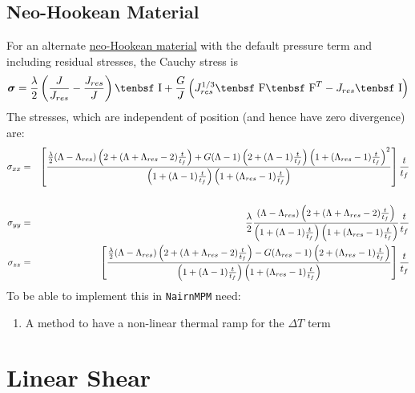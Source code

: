 \documentclass[11pt]{book}
\newcommand{\tens}[1]{\boldsymbol{\mathsf{#1}}}
\def\F{\hbox{\tenbsf F}}
\def\I{\hbox{\tenbsf I}}
\def\Jres{J_{res}}
\begin{document}
\subsection{Neo-Hookean Material}

For an alternate \hyperref[NHM]{neo-Hookean material} with the default pressure term and including residual stresses, the Cauchy stress is
\begin{equation}
     \tens\sigma = {\lambda\over 2}\left({J\over\Jres}- {\Jres\over J}\right)\I + { G\over J}\left( \Jres^{1/3}\F\F^T - \Jres\I\right) 
\end{equation}
The stresses, which are independent of position (and hence have zero divergence) are:
\begin{eqnarray}
    \sigma_{xx} & = & \left[ {{\lambda\over 2}(\Lambda-\Lambda_{res})\left(2 + (\Lambda+\Lambda_{res}-2){t\over t_f}\right) 
                                      +  G  (\Lambda-1) \left(2 + (\Lambda-1){t\over t_f}\right)\left(1 + (\Lambda_{res}-1){t\over t_f}\right)^2\over
                                     \left(1 + (\Lambda-1){t\over t_f}\right) \left(1 + (\Lambda_{res}-1){t\over t_f}\right)}
                                      \right]  {t\over t_f }  \nonumber\\ &&\\
    \sigma_{yy} & = &  {\lambda\over 2} {(\Lambda-\Lambda_{res})\left(2 + (\Lambda+\Lambda_{res}-2){t\over t_f}\right) \over
                                    \left(1 + (\Lambda-1){t\over t_f}\right) \left(1 + (\Lambda_{res}-1){t\over t_f}\right)}{t\over t_f } \\
    \sigma_{zz} & = & \left[  {{\lambda\over 2}(\Lambda-\Lambda_{res})\left(2 + (\Lambda+\Lambda_{res}-2){t\over t_f}\right)  - G (\Lambda_{res}-1) \left(2 + (\Lambda_{res}-1){t\over t_f}\right)\over
                                     \left(1 + (\Lambda-1){t\over t_f}\right) \left(1 + (\Lambda_{res}-1){t\over t_f}\right)}\right]  {t\over t_f }  
\end{eqnarray}
To be able to implement this in {\tt NairnMPM} need:
\begin{enumerate}
\item A method to have a non-linear thermal ramp for the $\Delta T$ term
\end{enumerate}

\section{Linear Shear}
\end{document}
